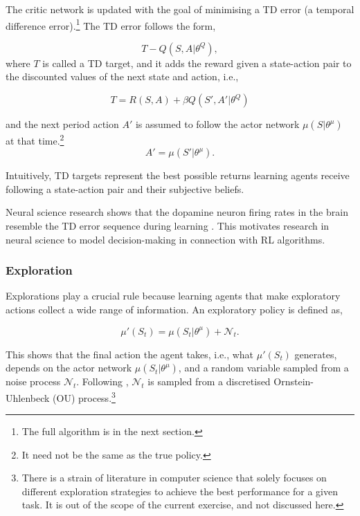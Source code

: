 \documentclass[hidelinks]{article}
\begin{document}
The critic network is updated with the goal of minimising a TD error (a temporal difference error).\footnote{The full algorithm is in the next section.} The TD error follows the form,

\begin{equation}
	\label{TD error}
	 T - Q(S, A|\theta^Q),
\end{equation}
where $T$ is called a TD target, and it adds the reward given a state-action pair to the discounted values of the next state and action, i.e.,

\begin{equation}
	T = R(S, A) + \beta Q(S',A'|\theta^Q)
\end{equation}

and the next period action $A'$ is assumed to follow the actor network $\mu(S|\theta^\mu)$ at that time.\footnote{It need not be the same as the true policy.}
\begin{equation}
	A' = \mu(S'|\theta^\mu).
\end{equation}

Intuitively, TD targets represent the best possible returns learning agents receive following a state-action pair and their subjective beliefs. 

Neural science research shows that the dopamine neuron firing rates in the brain resemble the TD error sequence during learning \citep{Botvinick2019}. This motivates research in neural science to model decision-making in connection with RL algorithms. 


\subsubsection{Exploration}


Explorations play a crucial rule because learning agents that make exploratory actions collect a wide range of information. An exploratory policy is defined as,

\begin{equation}
	\label{OU}
	\mu'(S_t) = \mu(S_t|\theta^\mu) + \mathcal{N}_t.
\end{equation}

This shows that the final action the agent takes, i.e., what $\mu'(S_t)$ generates, depends on the actor network  $\mu(S_t|\theta^\mu)$, and a random variable sampled from a noise process $\mathcal{N}_t$. Following \cite{lillicrap2015drl}, $\mathcal{N}_t$ is sampled from a discretised Ornstein-Uhlenbeck (OU) process.\footnote{There is a strain of literature in computer science that solely focuses on different exploration strategies to achieve the best performance for a given task. It is out of the scope of the current exercise, and not discussed here.}  
\end{document}
